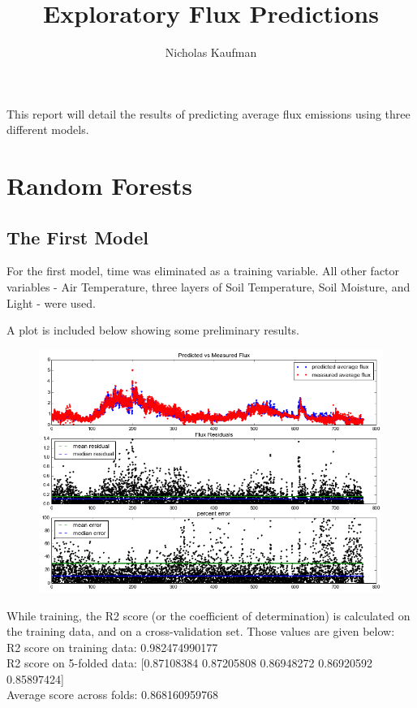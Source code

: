 \documentclass{article}
\title{Exploratory Flux Predictions}
\author{Nicholas Kaufman}
\begin{document}
\maketitle

This report will detail the results of predicting average flux emissions using three different models.

\section*{Random Forests}

\subsection*{The First Model}
For the first model, time was eliminated as a training variable. All other factor variables - Air Temperature, three layers of Soil Temperature, Soil Moisture, and Light - were used.

A plot is included below showing some preliminary results.

\begin{figure}[H]
	\includegraphics[width=\textwidth, height=\textheight, keepaspectratio]{rf1.png}
\end{figure}

While training, the R2 score (or the coefficient of determination) is calculated on the training data, and on a cross-validation set. Those values are given below: \\
R2 score on training data:  0.982474990177 \\
R2 score on 5-folded data:  [0.87108384  0.87205808  0.86948272  0.86920592  0.85897424] \\
Average score across folds:  0.868160959768 \\
\end{document}
